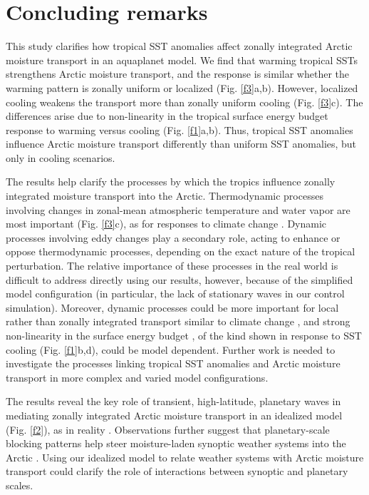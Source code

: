 \documentclass[draft]{agujournal2019}
\begin{document}
\section{Concluding remarks}

This study clarifies how tropical SST anomalies affect zonally integrated Arctic moisture transport in an aquaplanet model. We find that warming tropical SSTs strengthens Arctic moisture transport, and the response is similar whether the warming pattern is zonally uniform or localized (Fig. \ref{f3}a,b). However, localized cooling weakens the transport more than zonally uniform cooling (Fig. \ref{f3}c). The differences arise due to non-linearity in the tropical surface energy budget response to warming versus cooling (Fig. \ref{f1}a,b). Thus,  tropical SST anomalies  influence Arctic moisture transport differently than uniform SST anomalies, but only in cooling scenarios.



The results help clarify the processes by which the tropics influence zonally integrated moisture transport into the Arctic. Thermodynamic processes involving changes in zonal-mean atmospheric temperature and water vapor are most important (Fig. \ref{f3}c), as for responses to climate change \cite{HeldSoden2006, LorenzDeWeaver2007, Seager2010}. Dynamic processes involving eddy changes \cite{Robinson2002, Seager2003, Lee2011a, BaggettLee2015} play a secondary role, acting to enhance or oppose thermodynamic processes, depending on the exact nature of the tropical perturbation. The relative importance of these processes in the real world is difficult to address directly using our results, however, because of the simplified model configuration (in particular, the lack of stationary waves in our control simulation). Moreover, dynamic processes could be more important for local rather than zonally integrated transport similar to climate change \cite{Seager2014, Simpson2016, Wills2016}, and strong non-linearity in the surface energy budget \cite{Shaw2015, Shin2017}, of the kind shown in response to SST cooling (Fig. \ref{f1}b,d), could be model dependent. Further work is needed to investigate the processes linking tropical SST anomalies and Arctic moisture transport in more complex and varied model configurations.



The results reveal the key role of transient, high-latitude, planetary waves in mediating zonally integrated Arctic moisture transport in an idealized model (Fig. \ref{f2}), as in reality \cite{BaggettLee2015, GraversenBurtu2016, Heiskanen2020, Lee2019, PapritzDunnSigouin2020}. Observations further suggest that planetary-scale blocking patterns help steer moisture-laden synoptic weather systems into the Arctic \cite{Woods2013,PapritzDunnSigouin2020,Ruggieri2020}. Using our idealized model to relate weather systems with Arctic moisture transport could clarify the role of interactions between synoptic and planetary scales. 
\end{document}

